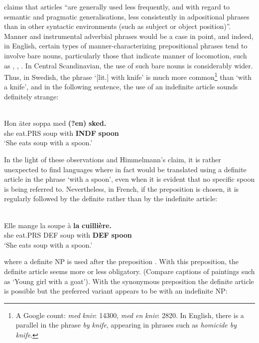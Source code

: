 \citet{Himmelmann1998} claims that articles “are generally used less frequently, and with regard to semantic and pragmatic generalisations, less consistently in adpositional phrases than in other syntactic environments (such as subject or object position)”. Manner and instrumental adverbial phrases would be a case in point, and indeed, in English, certain types of manner-characterizing prepositional phrases tend to involve bare nouns, particularly those that indicate manner of locomotion, such as , , . In Central Scandinavian, the use of such bare nouns is considerably wider. Thus, in Swedish, the phrase  ‘[lit.] with knife’ is much more common\footnote{ A Google count: \textit{med}\textit{ }\textit{kniv}: 14300, \textit{med en kniv}: 2820. In English, there is a parallel in the phrase \textit{by} \textit{knife}, appearing in phrases such as \textit{homicide by knife}.} than ‘with a knife’, and in the following sentence, the use of an indefinite article sounds definitely strange:

\ea \label{} 
\\
\gll Hon  äter  soppa  med  \textbf{(?en)} \textbf{  sked.}\\
she  eat.PRS  soup  with  \textbf{INDF} \textbf{spoon}\\
\glt ‘She eats soup with a spoon.’

\z

In the light of these observations and Himmelmann’s claim, it is rather unexpected to find languages where in fact  would be translated using a definite article in the phrase ‘with a spoon’, even when it is evident that no specific spoon is being referred to. Nevertheless, in French, if the preposition  is chosen, it is regularly followed by the definite rather than by the indefinite article:

\ea \label{} 
\\
\gll Elle  mange  la  soupe  à  \textbf{la} \textbf{cuillière.}\\
she  eat.PRS  DEF  soup  with  \textbf{DEF} \textbf{spoon}\\
\glt ‘She eats soup with a spoon.’

\z

where a definite NP is used after the preposition . With this preposition, the definite article seems more or less obligatory. (Compare captions of paintings such as  ‘Young girl with a goat’). With the synonymous preposition  the definite article is possible but the preferred variant appears to be with an indefinite NP:

